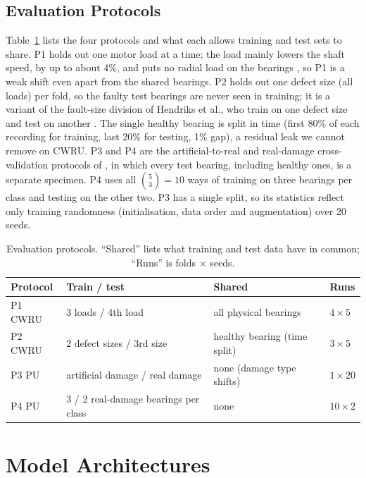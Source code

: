 \documentclass[conference]{IEEEtran}
\begin{document}
\subsection{Evaluation Protocols}
Table~\ref{tab:protocols} lists the four protocols and what each allows training and test sets to share. P1 holds out one motor load at a time; the load mainly lowers the shaft speed, by up to about 4\%, and puts no radial load on the bearings \cite{smith2015cwru,hendriks2022cwru}, so P1 is a weak shift even apart from the shared bearings. P2 holds out one defect size (all loads) per fold, so the faulty test bearings are never seen in training; it is a variant of the fault-size division of Hendriks et al., who train on one defect size and test on another \cite{hendriks2022cwru}. The single healthy bearing is split in time (first 80\% of each recording for training, last 20\% for testing, 1\% gap), a residual leak we cannot remove on CWRU. P3 and P4 are the artificial-to-real and real-damage cross-validation protocols of \cite{lessmeier2016kat}, in which every test bearing, including healthy ones, is a separate specimen. P4 uses all $\binom{5}{3}=10$ ways of training on three bearings per class and testing on the other two. P3 has a single split, so its statistics reflect only training randomness (initialisation, data order and augmentation) over 20 seeds.

\begin{table}[t]
\centering
\caption{Evaluation protocols. ``Shared'' lists what training and test data have in common; ``Runs'' is folds $\times$ seeds.}
\label{tab:protocols}
\footnotesize
\begin{tabular}{@{}p{1.15cm}p{2.6cm}p{2.25cm}l@{}}
\toprule
Protocol & Train / test & Shared & Runs \\
\midrule
P1 CWRU & 3 loads / 4th load & all physical bearings & $4\times5$ \\
P2 CWRU & 2 defect sizes / 3rd size & healthy bearing (time split) & $3\times5$ \\
P3 PU & artificial damage / real damage \cite{lessmeier2016kat} & none (damage type shifts) & $1\times20$ \\
P4 PU & 3 / 2 real-damage bearings per class & none & $10\times2$ \\
\bottomrule
\end{tabular}
\end{table}

\section{Model Architectures}
\end{document}
